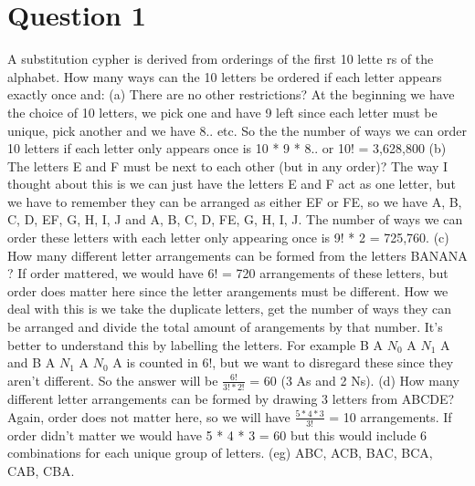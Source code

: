 \documentclass[12pt]{report}
\title{ST3009 Weekly Questions #1}
\author{Seamus Woods \\ 15317173}
\date{28/01/2019}
\begin{document}
\maketitle
\newpage

\section{Question 1}
A substitution cypher is derived from orderings of the first 10 lette
rs of the
alphabet. How many ways can the 10 letters be ordered if each letter appears exactly once
and: 
\newline
\newline
(a) There are no other restrictions? 
\newline
At the beginning we have the choice of 10 letters, we pick one and have 9 left since each letter must be unique, pick another and we have 8.. etc. So the the number of ways we can order 10 letters if each letter only appears once is 10 * 9 * 8.. or 
10! = 3,628,800  
\newline
\newline
(b) The letters E and F must be next to each other (but in any order)?
\newline
The way I thought about this is we can just have the letters E and F act as one letter, but we have to remember they can be arranged as either EF or FE, so we have A, B, C, D, EF, G, H, I, J and A, B, C, D, FE, G, H, I, J. The number of ways we can order these letters with each letter only appearing once is 9! * 2 = 725,760.
\newline
\newline
(c) How many different letter arrangements can be formed from the letters BANANA ?
\newline
If order mattered, we would have 6! = 720 arrangements of these letters, but order does matter here since the letter arangements must be different. How we deal with this is we take the duplicate letters, get the number of ways they can be arranged and divide the total amount of arangements by that number. It's better to understand this by labelling the letters. For example B A $N_0$ A $N_1$ A and B A $N_1$ A $N_0$ A is counted in 6!, but we want to disregard these since they aren't different. So the answer will be $\frac{6!}{3!*2!}$ = 60 (3 As and 2 Ns).
\newline
\newline
(d) How many different letter arrangements can be formed by drawing 3 letters from ABCDE?
\newline
Again, order does not matter here, so we will have $\frac{5*4*3}{3!}$ = 10 arrangements. If order didn't matter we would have 5 * 4 * 3 = 60 but this would include 6 combinations for each unique group of letters. (eg) ABC, ACB, BAC, BCA, CAB, CBA.
\end{document}

